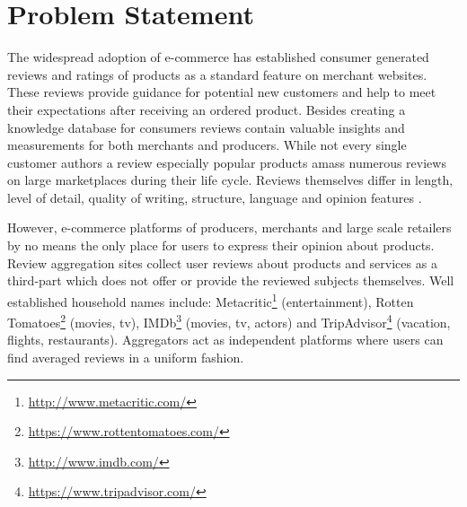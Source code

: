 \section{Problem Statement}
The widespread adoption of e-commerce has established consumer generated reviews and ratings of products as a standard feature on merchant websites.
These reviews provide guidance for potential new customers and help to meet their expectations after receiving an ordered product.
Besides creating a knowledge database for consumers reviews contain valuable insights and measurements for both merchants and producers.
While not every single customer authors a review especially popular products amass numerous reviews on large marketplaces during their life cycle.
Reviews themselves differ in length, level of detail, quality of writing, structure, language and opinion features \cite{Hu2004a}.

However, e-commerce platforms of producers, merchants and large scale retailers by no means the only place for users to express their opinion about products.
Review aggregation sites collect user reviews about products and services as a third-part which does not offer or provide the reviewed subjects themselves.
Well established household names include: Metacritic\footnote{\url{http://www.metacritic.com/}} (entertainment), Rotten Tomatoes\footnote{\url{https://www.rottentomatoes.com/}} (movies, tv), IMDb\footnote{\url{http://www.imdb.com/}} (movies, tv, actors) and TripAdvisor\footnote{\url{https://www.tripadvisor.com/}} (vacation, flights, restaurants).
Aggregators act as independent platforms where users can find averaged reviews in a uniform fashion.

